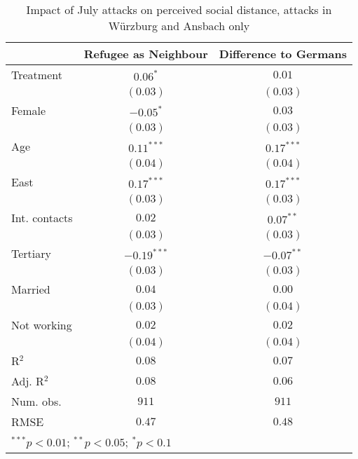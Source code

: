 
\begin{table}
\caption{Impact of July attacks on perceived social distance, attacks in Würzburg and Ansbach only}
\begin{center}
\begin{tabular}{l c c}
\toprule
 & Refugee as Neighbour & Difference to Germans \\
\midrule
Treatment     & $0.06^{*}$    & $0.01$       \\
              & $(0.03)$      & $(0.03)$     \\
Female        & $-0.05^{*}$   & $0.03$       \\
              & $(0.03)$      & $(0.03)$     \\
Age           & $0.11^{***}$  & $0.17^{***}$ \\
              & $(0.04)$      & $(0.04)$     \\
East          & $0.17^{***}$  & $0.17^{***}$ \\
              & $(0.03)$      & $(0.03)$     \\
Int. contacts & $0.02$        & $0.07^{**}$  \\
              & $(0.03)$      & $(0.03)$     \\
Tertiary      & $-0.19^{***}$ & $-0.07^{**}$ \\
              & $(0.03)$      & $(0.03)$     \\
Married       & $0.04$        & $0.00$       \\
              & $(0.03)$      & $(0.04)$     \\
Not working   & $0.02$        & $0.02$       \\
              & $(0.04)$      & $(0.04)$     \\
\midrule
R$^2$         & $0.08$        & $0.07$       \\
Adj. R$^2$    & $0.08$        & $0.06$       \\
Num. obs.     & $911$         & $911$        \\
RMSE          & $0.47$        & $0.48$       \\
\bottomrule
\multicolumn{3}{l}{\scriptsize{$^{***}p<0.01$; $^{**}p<0.05$; $^{*}p<0.1$}}
\end{tabular}
\label{tab_dist_no_nice}
\end{center}
\end{table}
